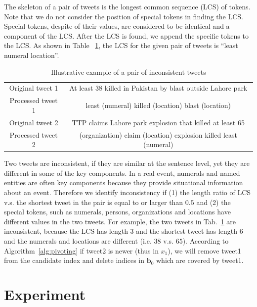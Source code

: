 \documentclass[envcountsame]{llncs}
\begin{document}
The skeleton of a pair of tweets is the longest common sequence (LCS) of tokens. Note that we do not consider the position of special tokens in finding the LCS. Special tokens, despite of their values, are considered to be identical and a component of the LCS. After the LCS is found, we append the specific tokens to the LCS. As shown in Table ~\ref{tab:example}, the LCS for the given pair of tweets is ``least numeral location''.

\begin{table}[ht]
\caption{Illustrative example of a pair of inconsistent tweets}\label{tab:example}
\begin{tabular}{|c|c|}
\hline
Original tweet 1 & At least 38 killed in Pakistan by blast outside Lahore park \\
Processed tweet 1  & least (numeral) killed  (location) blast  (location)\\\hline
Original tweet 2 & TTP claims Lahore park explosion that killed at least 65 \\
Processed tweet 2& (organization) claim (location) explosion killed least (numeral)\\\hline
\end{tabular}
\end{table}

Two tweets are inconsistent, if they are similar at the sentence level, yet they are different in some of the key components. In a real event, numerals and named entities are often key components because they provide situational information about an event. Therefore we identify inconsistency if (1) the length ratio of LCS v.s. the shortest tweet in the pair is equal to or larger than $0.5$ and (2) the special tokens, such as numerals, persons, organizations and locations have different values in the two tweets. For example, the two tweets in Tab.~\ref{tab:example} are inconsistent, because the LCS has length $3$ and the shortest tweet has length $6$ and the numerals and locations are different (i.e. $38$ v.s. $65$). According to Algorithm~\ref{alg:pivoting} if tweet2 is newer (thus in $x_1$), we will remove tweet1 from the candidate index and delete indices in $\mathbf{b}_0$ which are covered by tweet1.

\section{Experiment}\label{sec:experiment}
\end{document}
